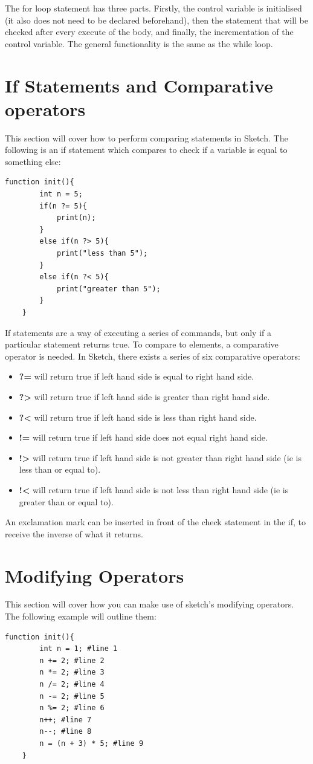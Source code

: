 \documentclass{l3proj}
\begin{document}
The for loop statement has three parts. Firstly, the control variable is initialised (it also does not need to be declared beforehand), then the statement that will be checked after every execute of the body, and finally, the incrementation of the control variable. The general functionality is the same as the while loop.
\section{If Statements and Comparative operators}
\label{comp}
This section will cover how to perform comparing statements in Sketch. The following is an if statement which compares to check if a variable is equal to something else:
\begin{lstlisting}[caption={If-Else Conditionals},label={lst:tutorial-ifelse}]
    function init(){
        int n = 5;
        if(n ?= 5){
            print(n);
        }
        else if(n ?> 5){
            print("less than 5");
        }
        else if(n ?< 5){
            print("greater than 5");
        }
    }
\end{lstlisting}

If statements are a way of executing a series of commands, but only if a particular statement returns true. To compare to elements, a comparative operator is needed. In Sketch, there exists a series of six comparative operators:
\begin{itemize}
\item \textbf{?=} will return true if left hand side is equal to right hand side.
\item \textbf{?\textgreater} will return true if left hand side is greater than right hand side.
\item \textbf{?\textless} will return true if left hand side is less than right hand side.
\item \textbf{!=} will return true if left hand side does not equal right hand side.
\item \textbf{!\textgreater} will return true if left hand side is not greater than right hand side (ie is less than or equal to).
\item \textbf{!\textless} will return true if left hand side is not less than right hand side (ie is greater than or equal to).
\end{itemize}

An exclamation mark can be inserted in front of the check statement in the if, to receive the inverse of what it returns.

\section{Modifying Operators}
This section will cover how you can make use of sketch's modifying operators. The following example will outline them:
\begin{lstlisting}[caption={Modifying Operators in Action}, label={lst:tutorial-modify}]
    function init(){
        int n = 1; #line 1
        n += 2; #line 2
        n *= 2; #line 3
        n /= 2; #line 4
        n -= 2; #line 5
        n %= 2; #line 6
        n++; #line 7
        n--; #line 8
        n = (n + 3) * 5; #line 9
    }
\end{lstlisting}
\end{document}
